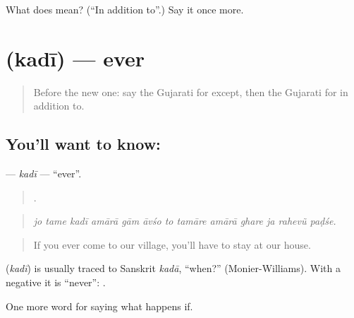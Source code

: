 \begin{tcolorbox}[breakable,colback=teal!4,colframe=teal!35!black,title={Before you move on}]
What does  mean? (\textquotedblleft{}In addition to\textquotedblright{}.) Say it once more.
\end{tcolorbox}
\section[\texorpdfstring{\gu{કદી} (kadī)}{કદી (kadī)}]{ (kadī) — ever}

\label{lesson:GU-C546-kadi}



\begin{quote}
Before the new one: say the Gujarati for except, then the Gujarati for in addition to.
\end{quote}

\subsection*{You'll want to know: }
\textbf{} — \emph{kadī} — \textquotedblleft{}ever\textquotedblright{}.

\begin{quote}
            .
\end{quote}

\begin{quote}
\emph{jo tame kadī amārā gām āvśo to tamāre amārā ghare ja rahevũ paḍśe.}
\end{quote}

\begin{quote}
If you ever come to our village, you'll have to stay at our house.
\end{quote}

\begin{cousinweb}
\textbf{} (\emph{kadī}) is usually traced to Sanskrit \emph{kadā}, \textquotedblleft{}when?\textquotedblright{} (Monier-Williams). With a negative it is \textquotedblleft{}never\textquotedblright{}: \textbf{ }.
\end{cousinweb}

\begin{grammarlens}[title={What you've built}]
One more word for saying what happens if.
\end{grammarlens}

